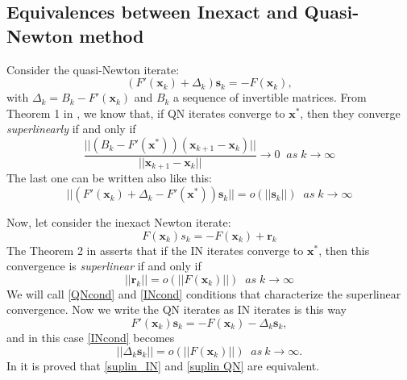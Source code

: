    \subsection{Equivalences between Inexact and Quasi-Newton method} Consider the quasi-Newton iterate: 
   \begin{equation*}
   (F'(\textbf{x}_k) + \Delta_k) \textbf{s}_k = -F(\textbf{x}_k),
   \end{equation*}
     with $\Delta_k = B_k - F'(\textbf{x}_k)$ and $B_k$ a sequence of invertible matrices. From Theorem 1 in \cite{Emil}, we know that, if QN iterates converge to $\textbf{x}^{*}$, then they converge \textit{superlinearly} if and only if 
     \begin{equation}
     \label{QNcond}
     \frac{||(B_k-F'(\textbf{x}^*))(\textbf{x}_{k+1}-\textbf{x}_{k})||}{||\textbf{x}_{k+1}-\textbf{x}_{k}||} \rightarrow 0 \; \; as\; k\rightarrow \infty
     \end{equation} 
   The last one can be written also like this: 
      \begin{equation}
      \label{suplin QN}
      ||(F'(\textbf{x}_k)+\Delta_k -F'(\textbf{x}^*))\textbf{s}_k|| = o(||\textbf{s}_k||) \; \; as \; k \rightarrow \infty
      \end{equation}

   Now, let consider the inexact Newton iterate: 
   \begin{equation*}
   F(\textbf{x}_k)s_k = -F(\textbf{x}_k)+\textbf{r}_k
   \end{equation*}
    The Theorem 2 in \cite{Emil} asserts that if the IN iterates converge to $\textbf{x}^*$, then this convergence is \textit{superlinear} if and only if 
    \begin{equation}
    \label{INcond}
    ||\textbf{r}_k||=o(||F(\textbf{x}_k)||) \; \; as \; k \rightarrow \infty
    \end{equation}
       We will call \eqref{QNcond} and \eqref{INcond} conditions that characterize the superlinear convergence.
   Now we write the QN iterates as IN iterates is this way
      \begin{equation*}
      F'(\textbf{x}_k)\textbf{s}_k = -F(\textbf{x}_k)-\Delta_k \textbf{s}_k,
      \end{equation*}
   and in this case \eqref{INcond} becomes 
       \begin{equation}
       \label{suplin_IN}
       ||\Delta_k\textbf{s}_k||= o (||F(\textbf{x}_k)||) \; \; as \: k \rightarrow \infty.
       \end{equation}
      In \cite{Emil} it is proved that \eqref{suplin_IN} and \eqref{suplin QN} are equivalent. \\
      
